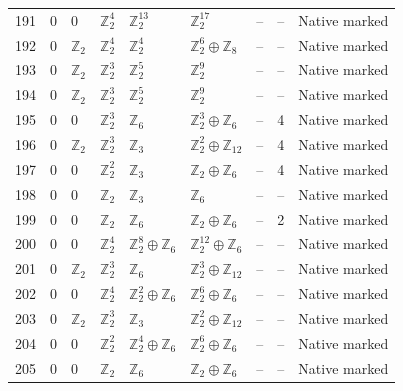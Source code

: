 \documentclass[10pt]{article}
\begin{document}
\begin{longtable}{r|lllll|rrl}
191 & $0$ & $0$ & $\mathbb{Z}_{2}^{4}$ & $\mathbb{Z}_{2}^{13}$ & $\mathbb{Z}_{2}^{17}$ & -- & -- & Native marked\\
192 & $0$ & $\mathbb{Z}_{2}$ & $\mathbb{Z}_{2}^{4}$ & $\mathbb{Z}_{2}^{4}$ & $\mathbb{Z}_{2}^{6}\oplus \mathbb{Z}_{8}$ & -- & -- & Native marked\\
193 & $0$ & $\mathbb{Z}_{2}$ & $\mathbb{Z}_{2}^{3}$ & $\mathbb{Z}_{2}^{5}$ & $\mathbb{Z}_{2}^{9}$ & -- & -- & Native marked\\
194 & $0$ & $\mathbb{Z}_{2}$ & $\mathbb{Z}_{2}^{3}$ & $\mathbb{Z}_{2}^{5}$ & $\mathbb{Z}_{2}^{9}$ & -- & -- & Native marked\\
195 & $0$ & $0$ & $\mathbb{Z}_{2}^{3}$ & $\mathbb{Z}_{6}$ & $\mathbb{Z}_{2}^{3}\oplus \mathbb{Z}_{6}$ & -- & 4 & Native marked\\
196 & $0$ & $\mathbb{Z}_{2}$ & $\mathbb{Z}_{2}^{3}$ & $\mathbb{Z}_{3}$ & $\mathbb{Z}_{2}^{2}\oplus \mathbb{Z}_{12}$ & -- & 4 & Native marked\\
197 & $0$ & $0$ & $\mathbb{Z}_{2}^{2}$ & $\mathbb{Z}_{3}$ & $\mathbb{Z}_{2}\oplus \mathbb{Z}_{6}$ & -- & 4 & Native marked\\
198 & $0$ & $0$ & $\mathbb{Z}_{2}$ & $\mathbb{Z}_{3}$ & $\mathbb{Z}_{6}$ & -- & -- & Native marked\\
199 & $0$ & $0$ & $\mathbb{Z}_{2}$ & $\mathbb{Z}_{6}$ & $\mathbb{Z}_{2}\oplus \mathbb{Z}_{6}$ & -- & 2 & Native marked\\
200 & $0$ & $0$ & $\mathbb{Z}_{2}^{4}$ & $\mathbb{Z}_{2}^{8}\oplus \mathbb{Z}_{6}$ & $\mathbb{Z}_{2}^{12}\oplus \mathbb{Z}_{6}$ & -- & -- & Native marked\\
201 & $0$ & $\mathbb{Z}_{2}$ & $\mathbb{Z}_{2}^{3}$ & $\mathbb{Z}_{6}$ & $\mathbb{Z}_{2}^{3}\oplus \mathbb{Z}_{12}$ & -- & -- & Native marked\\
202 & $0$ & $0$ & $\mathbb{Z}_{2}^{4}$ & $\mathbb{Z}_{2}^{2}\oplus \mathbb{Z}_{6}$ & $\mathbb{Z}_{2}^{6}\oplus \mathbb{Z}_{6}$ & -- & -- & Native marked\\
203 & $0$ & $\mathbb{Z}_{2}$ & $\mathbb{Z}_{2}^{3}$ & $\mathbb{Z}_{3}$ & $\mathbb{Z}_{2}^{2}\oplus \mathbb{Z}_{12}$ & -- & -- & Native marked\\
204 & $0$ & $0$ & $\mathbb{Z}_{2}^{2}$ & $\mathbb{Z}_{2}^{4}\oplus \mathbb{Z}_{6}$ & $\mathbb{Z}_{2}^{6}\oplus \mathbb{Z}_{6}$ & -- & -- & Native marked\\
205 & $0$ & $0$ & $\mathbb{Z}_{2}$ & $\mathbb{Z}_{6}$ & $\mathbb{Z}_{2}\oplus \mathbb{Z}_{6}$ & -- & -- & Native marked\\

\end{longtable}
\end{document}

